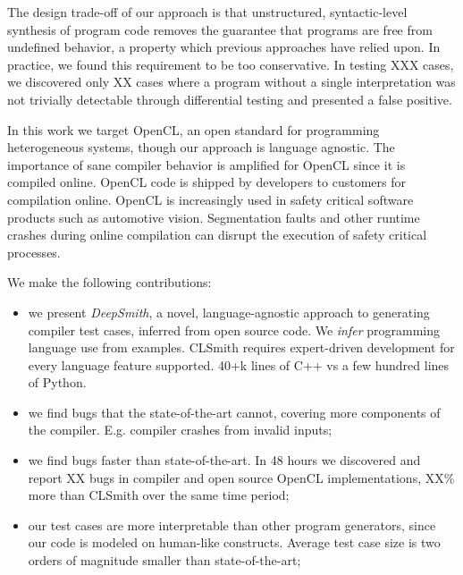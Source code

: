 The design trade-off of our approach is that unstructured, syntactic-level synthesis of program code removes the guarantee that programs are free from undefined behavior, a property which previous approaches have relied upon. In practice, we found this requirement to be too conservative. In testing XXX cases, we discovered only XX cases where a program without a single interpretation was not trivially detectable through differential testing and presented a false positive.

In this work we target OpenCL, an open standard for programming heterogeneous systems, though our approach is language agnostic. The importance of sane compiler behavior is amplified for OpenCL since it is compiled online. OpenCL code is shipped by developers to customers for compilation online. OpenCL is increasingly used in safety critical software products such as automotive vision. Segmentation faults and other runtime crashes during online compilation can disrupt the execution of safety critical processes.

We make the following contributions:
%
\begin{itemize}
\item we present \emph{DeepSmith}, a novel, language-agnostic approach to generating compiler test cases, inferred from open source code. We \emph{infer} programming language use from examples. CLSmith requires expert-driven development for every language feature supported. 40+k lines of C++ vs a few hundred lines of Python.
\item we find bugs that the state-of-the-art cannot, covering more components of the compiler. E.g. compiler crashes from invalid inputs;
\item we find bugs faster than state-of-the-art. In 48 hours we discovered and report XX bugs in compiler and open source OpenCL implementations, XX\% more than CLSmith over the same time period;
\item our test cases are more interpretable than other program generators, since our code is modeled on human-like constructs. Average test case size is two orders of magnitude smaller than state-of-the-art;
\end{itemize}
